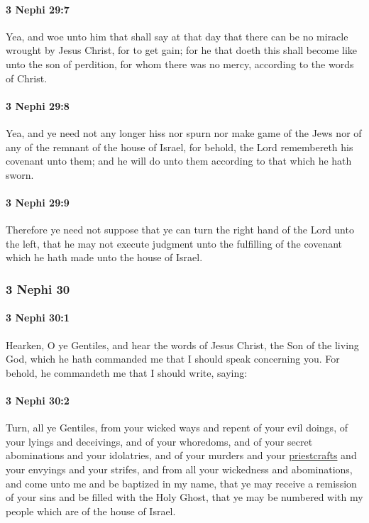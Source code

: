 		\paragraph{3 Nephi 29:7} %
			\label{3NEPHI-29-7}

			Yea, and woe unto him that shall say at that day
			that there can be no miracle wrought by Jesus Christ,
			for to get gain;
			for he that doeth this shall become like unto the son of perdition,
			for whom there was no mercy, according to the words of Christ.

		\paragraph{3 Nephi 29:8} %
			\label{3NEPHI-29-8}

			Yea, and ye need not any longer hiss nor spurn
			nor make game of the Jews nor of any of the remnant of the house of Israel,
			for behold, the Lord remembereth his covenant unto them;
			and he will do unto them according to that which he hath sworn.

		\paragraph{3 Nephi 29:9} %
			\label{3NEPHI-29-9}

			Therefore ye need not suppose
			that ye can turn the right hand of the Lord unto the left,
			that he may not execute judgment unto the fulfilling of the covenant
			which he hath made unto the house of Israel.

	\subsubsection{3 Nephi 30} %
		\label{3NEPHI-30}
		
		\paragraph{3 Nephi 30:1} %
			\label{3NEPHI-30-1}

			Hearken, O ye Gentiles,
			and hear the words of Jesus Christ, the Son of the living God,
			which he hath commanded me that I should speak concerning you.
			For behold, he commandeth me that I should write, saying:

		\paragraph{3 Nephi 30:2} %
			\label{3NEPHI-30-2}

			Turn, all ye Gentiles, from your wicked ways
			and repent of your evil doings, of your lyings and deceivings,
			and of your whoredoms, and of your secret abominations and your idolatries,
			and of your murders and your \hyperref[PRIESTCRAFT]{priestcrafts} and your envyings and your strifes,
			and from all your wickedness and abominations,
			and come unto me and be baptized in my name,
			that ye may receive a remission of your sins
			and be filled with the Holy Ghost,
			that ye may be numbered with my people
			which are of the house of Israel.